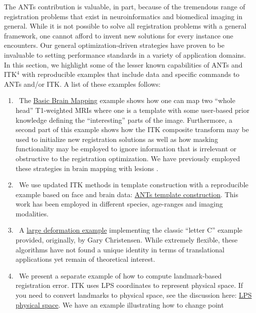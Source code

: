 \documentclass{frontiersSCNS}
\begin{document}
The ANTs contribution is valuable, in part, because of the tremendous range of
registration problems that exist in neuroinformatics and biomedical
imaging in general.  While it is not possible to solve all registration problems with a
general framework, one cannot afford to invent new
solutions for every instance one encounters.  Our general optimization-driven strategies have
proven to be invaluable to setting performance standards in a variety
of application domains.   In this section, we highlight some of the
lesser known capabilities of ANTs and ITK$^4$ with reproducible
examples that include data and specific commands to ANTs and/or ITK.  
A list of these examples follows:
\begin{enumerate}
  \item~The \href{http://stnava.github.io/BasicBrainMapping/}{Basic
      Brain Mapping} example shows how one can map two ``whole head''
    T1-weighted MRIs where one is a template with some user-based prior
    knowledge defining the ``interesting'' parts of the image.
    Furthermore, a second part of this example shows how the ITK
    composite transform may be used to initialize new registration
    solutions as well as how masking functionality may be employed to
    ignore information that is irrelevant or obstructive to the
    registration optimization.  We have previously employed these
    strategies in brain mapping with lesions \cite{Avants2008,Kim2008,Kim2010,Tustison2011a,Kim2013}. 
  \item~We use updated ITK methods in template construction with a
    reproducible example based on face and brain data:
    \href{https://github.com/ntustison/TemplateBuildingExample}{ANTs
      template construction}.  This work has been employed in
    different species, age-ranges and imaging modalities. 
  \item~A \href{http://stnava.github.io/C/}{large deformation
      example} implementing the classic ``letter C'' example provided,
     originally, by Gary Christensen.  While extremely flexible, these
     algorithms have not found a unique identity in terms of
     translational applications yet remain of theoretical interest.
  \item~We present a separate example of how to compute landmark-based
    registration error.  ITK uses LPS coordinates to represent physical space.  If you
    need to convert landmarks to physical space, see the discussion here:
    \href{http://sourceforge.net/p/advants/discussion/840261/thread/2a1e9307/}{LPS
      physical
      space}.  We have an example illustrating how to change point

\end{enumerate}
\end{document}
